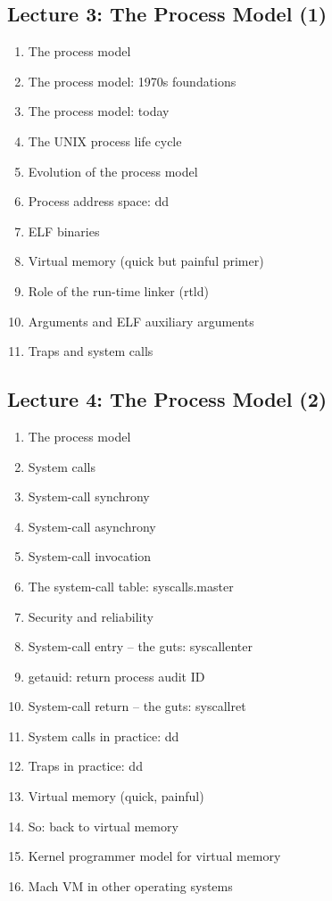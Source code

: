 \documentclass[a4paper,10pt]{article}
\begin{document}
\subsection*{Lecture 3: The Process Model (1)}

\begin{enumerate}
  \item The process model
  \item The process model: 1970s foundations
  \item The process model: today
  \item The UNIX process life cycle
  \item Evolution of the process model
  \item Process address space: dd
  \item ELF binaries
  \item Virtual memory (quick but painful primer)
  \item Role of the run-time linker (rtld)
  \item Arguments and ELF auxiliary arguments
  \item Traps and system calls
\end{enumerate}

\subsection*{Lecture 4: The Process Model (2)}

\begin{enumerate}
  \item The process model
  \item System calls
  \item System-call synchrony
  \item System-call asynchrony
  \item System-call invocation
  \item The system-call table: syscalls.master
  \item Security and reliability
  \item System-call entry -- the guts: syscallenter
  \item getauid: return process audit ID
  \item System-call return -- the guts: syscallret
  \item System calls in practice: dd
  \item Traps in practice: dd
  \item Virtual memory (quick, painful)
  \item So: back to virtual memory
  \item Kernel programmer model for virtual memory
  \item Mach VM in other operating systems
\end{enumerate}
\end{document}
